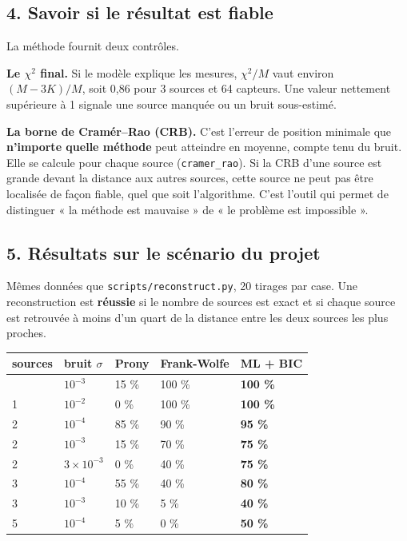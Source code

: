 \documentclass[
  french,
]{article}
\newcounter{none} %
\begin{document}
\subsection{4. Savoir si le résultat est
fiable}\label{savoir-si-le-ruxe9sultat-est-fiable}

La méthode fournit deux contrôles.

\textbf{Le \(\chi^2\) final.} Si le modèle explique les mesures,
\(\chi^2/M\) vaut environ \((M - 3K)/M\), soit 0,86 pour 3 sources et 64
capteurs. Une valeur nettement supérieure à 1 signale une source manquée
ou un bruit sous-estimé.

\textbf{La borne de Cramér--Rao (CRB).} C'est l'erreur de position
minimale que \textbf{n'importe quelle méthode} peut atteindre en
moyenne, compte tenu du bruit. Elle se calcule pour chaque source
(\texttt{cramer\_rao}). Si la CRB d'une source est grande devant la
distance aux autres sources, cette source ne peut pas être localisée de
façon fiable, quel que soit l'algorithme. C'est l'outil qui permet de
distinguer « la méthode est mauvaise » de « le problème est impossible
».

\subsection{5. Résultats sur le scénario du
projet}\label{ruxe9sultats-sur-le-scuxe9nario-du-projet}

Mêmes données que \texttt{scripts/reconstruct.py}, 20 tirages par case.
Une reconstruction est \textbf{réussie} si le nombre de sources est
exact et si chaque source est retrouvée à moins d'un quart de la
distance entre les deux sources les plus proches.

{\def\LTcaptype{none} %
\begin{longtable}[]{@{}lllll@{}}
\toprule\noalign{}
sources & bruit \(\sigma\) & Prony & Frank-Wolfe & \textbf{ML + BIC} \\
\midrule\noalign{}
\endhead
\bottomrule\noalign{}
\endlastfoot
1 & \(10^{-3}\) & 15 \% & 100 \% & \textbf{100 \%} \\
1 & \(10^{-2}\) & 0 \% & 100 \% & \textbf{100 \%} \\
2 & \(10^{-4}\) & 85 \% & 90 \% & \textbf{95 \%} \\
2 & \(10^{-3}\) & 15 \% & 70 \% & \textbf{75 \%} \\
2 & \(3\times 10^{-3}\) & 0 \% & 40 \% & \textbf{75 \%} \\
3 & \(10^{-4}\) & 55 \% & 40 \% & \textbf{80 \%} \\
3 & \(10^{-3}\) & 10 \% & 5 \% & \textbf{40 \%} \\
5 & \(10^{-4}\) & 5 \% & 0 \% & \textbf{50 \%} \\
\end{longtable}
}
\end{document}
